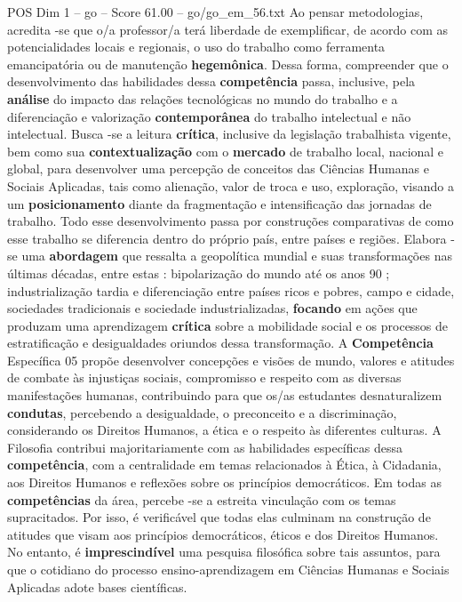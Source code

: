 \begin{textsample}{POS Dim 1 – go – Score 61.00 – go/go\_em\_56.txt}
Ao pensar metodologias, acredita -se que o/a professor/a terá liberdade de exemplificar, de acordo com as potencialidades locais e regionais, o uso do trabalho como ferramenta emancipatória ou de manutenção \textbf{hegemônica}.
Dessa forma, compreender que o desenvolvimento das habilidades dessa \textbf{competência} passa, inclusive, pela \textbf{análise} do impacto das relações tecnológicas no mundo do trabalho e a diferenciação e valorização \textbf{contemporânea} do trabalho intelectual e não intelectual.
Busca -se a leitura \textbf{crítica}, inclusive da legislação trabalhista vigente, bem como sua \textbf{contextualização} com o \textbf{mercado} de trabalho local, nacional e global, para desenvolver uma percepção de conceitos das Ciências Humanas e Sociais Aplicadas, tais como alienação, valor de troca e uso, exploração, visando a um \textbf{posicionamento} diante da fragmentação e intensificação das jornadas de trabalho.
Todo esse desenvolvimento passa por construções comparativas de como esse trabalho se diferencia dentro do próprio país, entre países e regiões.
Elabora -se uma \textbf{abordagem} que ressalta a geopolítica mundial e suas transformações nas últimas décadas, entre estas : bipolarização do mundo até os anos 90 ; industrialização tardia e diferenciação entre países ricos e pobres, campo e cidade, sociedades tradicionais e sociedade industrializadas, \textbf{focando} em ações que produzam uma aprendizagem \textbf{crítica} sobre a mobilidade social e os processos de estratificação e desigualdades oriundos dessa transformação.
A \textbf{Competência} Específica 05 propõe desenvolver concepções e visões de mundo, valores e atitudes de combate às injustiças sociais, compromisso e respeito com as diversas manifestações humanas, contribuindo para que os/as estudantes desnaturalizem \textbf{condutas}, percebendo a desigualdade, o preconceito e a discriminação, considerando os Direitos Humanos, a ética e o respeito às diferentes culturas.
A Filosofia contribui majoritariamente com as habilidades específicas dessa \textbf{competência}, com a centralidade em temas relacionados à Ética, à Cidadania, aos Direitos Humanos e reflexões sobre os princípios democráticos.
Em todas as \textbf{competências} da área, percebe -se a estreita vinculação com os temas supracitados.
Por isso, é verificável que todas elas culminam na construção de atitudes que visam aos princípios democráticos, éticos e dos Direitos Humanos.
No entanto, é \textbf{imprescindível} uma pesquisa filosófica sobre tais assuntos, para que o cotidiano do processo ensino-aprendizagem em Ciências Humanas e Sociais Aplicadas adote bases científicas.

\end{textsample}
